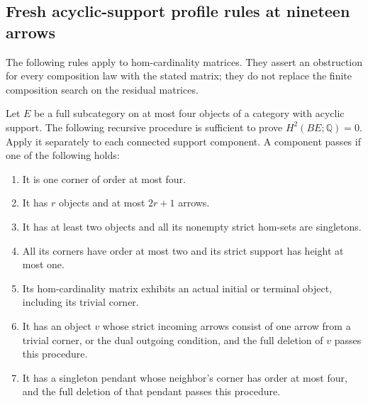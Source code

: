 \subsection{Fresh acyclic-support profile rules at nineteen arrows}

The following rules apply to hom-cardinality matrices.  They assert an
obstruction for every composition law with the stated matrix; they do not
replace the finite composition search on the residual matrices.

\begin{lemma}
\label{CP2:A-nineteen-profile-H2-rules}
Let $E$ be a full subcategory on at most four objects of a category with
acyclic support.  The following recursive procedure is sufficient to prove
$H^2(BE;\mathbb Q)=0$.  Apply it separately to each connected support
component.  A component passes if one of the following holds:
\begin{enumerate}
\item It is one corner of order at most four.
\item It has $r$ objects and at most $2r+1$ arrows.
\item It has at least two objects and all its nonempty strict hom-sets
are singletons.
\item All its corners have order at most two and its strict support has
height at most one.
\item Its hom-cardinality matrix exhibits an actual initial or terminal
object, including its trivial corner.
\item It has an object $v$ whose strict incoming arrows consist of one
arrow from a trivial corner, or the dual outgoing condition, and the
full deletion of $v$ passes this procedure.
\item It has a singleton pendant whose neighbor's corner has order at
most four, and the full deletion of that pendant passes this procedure.
\end{enumerate}
\end{lemma}
